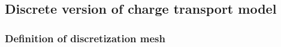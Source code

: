 \documentclass[10pt,a4paper, final]{article}
\theoremstyle{definition}								%
\numberwithin{equation}{section}
\numberwithin{figure}{section}
\numberwithin{theorem}{section}
\begin{document}
\subsection{Discrete version of charge transport model}
\label{sec:FVM}


\subsubsection{Definition of discretization mesh} \label{sec:fvm-meshes}
\end{document}
